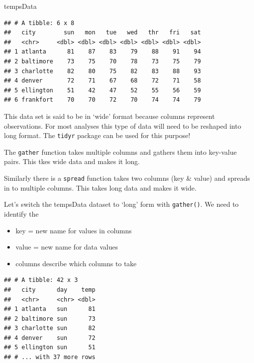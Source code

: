 \documentclass[
]{book}
\newenvironment{Shaded}{\begin{snugshade}}{\end{snugshade}}
\newcommand{\DataTypeTok}[1]{\textcolor[rgb]{0.13,0.29,0.53}{#1}}
\newcommand{\DecValTok}[1]{\textcolor[rgb]{0.00,0.00,0.81}{#1}}
\newcommand{\KeywordTok}[1]{\textcolor[rgb]{0.13,0.29,0.53}{\textbf{#1}}}
\newcommand{\NormalTok}[1]{#1}
\newcommand{\OperatorTok}[1]{\textcolor[rgb]{0.81,0.36,0.00}{\textbf{#1}}}
\newcommand{\StringTok}[1]{\textcolor[rgb]{0.31,0.60,0.02}{#1}}
\theoremstyle{definition}
\theoremstyle{definition}
\theoremstyle{definition}
\theoremstyle{remark}
\begin{document}
\begin{Shaded}
\begin{Highlighting}[]
\NormalTok{tempsData}
\end{Highlighting}
\end{Shaded}

\begin{verbatim}
## # A tibble: 6 x 8
##   city        sun   mon   tue   wed   thr   fri   sat
##   <chr>     <dbl> <dbl> <dbl> <dbl> <dbl> <dbl> <dbl>
## 1 atlanta      81    87    83    79    88    91    94
## 2 baltimore    73    75    70    78    73    75    79
## 3 charlotte    82    80    75    82    83    88    93
## 4 denver       72    71    67    68    72    71    58
## 5 ellington    51    42    47    52    55    56    59
## 6 frankfort    70    70    72    70    74    74    79
\end{verbatim}

This data set is said to be in `wide' format because columns represent observations. For most analyses this type of data will need to be reshaped into long format. The \texttt{tidyr} package can be used for this purpose!

The \texttt{gather} function takes multiple columns and gathers them into key-value pairs. This tkes wide data and makes it long.

Similarly there is a \texttt{spread} function takes two columns (key \& value) and spreads in to multiple columns. This takes long data and makes it wide.

Let's switch the tempsData dataset to `long' form with \texttt{gather()}. We need to identify the

\begin{itemize}
\item
  key = new name for values in columns
\item
  value = new name for data values
\item
  columns describe which columns to take
\end{itemize}

\begin{Shaded}
\end{Shaded}

\begin{verbatim}
## # A tibble: 42 x 3
##   city      day    temp
##   <chr>     <chr> <dbl>
## 1 atlanta   sun      81
## 2 baltimore sun      73
## 3 charlotte sun      82
## 4 denver    sun      72
## 5 ellington sun      51
## # ... with 37 more rows
\end{verbatim}
\end{document}
